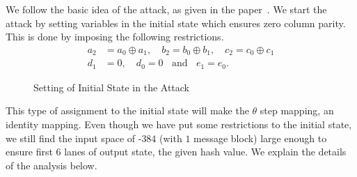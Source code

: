 We follow the basic idea of the attack, as given in the paper~\cite{naya2011practical}.
We start the attack by setting variables in the initial state which ensures zero column parity. 
This is done by imposing the following restrictions.
\begin{align}\nonumber
a_2 &= a_0 \oplus a_1,\quad b_2 = b_0 \oplus b_1, \quad c_2 = c_0 \oplus c_1\\ \label{cond_state1}
d_1 & = 0,\quad d_0 = 0\;\;\text{ and }\;\; e_1 = e_0. 
\end{align}

\begin{figure}
\begin{center}
\end{center}
\caption{Setting of Initial State in the Attack\label{initial_state}}
\end{figure}
This type of assignment to the initial state will make the {$\theta$} step mapping, an identity mapping. Even though we have put some restrictions to the initial state, we still find the input space of \Keccak-$384$ (with $1$ message block) large enough to ensure first $6$ lanes of output state, the given hash value. We explain the details of the analysis below. 

